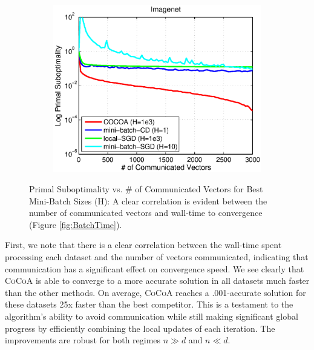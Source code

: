 \documentclass{article} %
\newcommand{\algname}{\textsc{CoCoA}\xspace}  %
\begin{document}
\begin{figure}[H]
\begin{subfigure}{.33\textwidth}
\includegraphics[width=\linewidth]{figs/Imagenet_Comm.eps}
\end{subfigure}\vspace{-1mm}
\caption{\small Primal Suboptimality vs. \# of Communicated Vectors for Best 
Mini-Batch Sizes (H): A clear correlation is evident between the number of 
communicated vectors and wall-time to convergence 
(Figure \ref{fig:BatchTime}).\vspace{-1mm}}
\label{fig:BatchComm}
\end{figure}


First, we note that there is a clear correlation between the wall-time
spent processing each dataset and the number of vectors communicated,
indicating that communication has a significant effect on convergence 
speed.
We see clearly that \algname is able to converge to a more accurate
solution in all datasets much faster than the other methods.
On average, \algname reaches a .001-accurate solution for these
datasets 25x faster than the best competitor. This is a testament
to the algorithm's ability to avoid communication while still making
significant global progress by efficiently combining the local updates
of each iteration.
The improvements are robust for both regimes $n\gg d$ and $n\ll d$.
\end{document}
